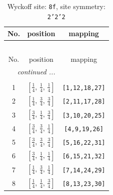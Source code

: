 \documentclass[fleqn,8pt]{jsarticle}
\begin{document}
\begin{longtable}{ccc}
\caption{Wyckoff site: {\tt 8f}, site symmetry: {\tt 2'2'2}}
 \\
 \hline \hline
No. & position & mapping \\ \hline \endfirsthead

\multicolumn{2}{l}{\tablename\ \thetable{}} \\
 \hline \hline
No. & position & mapping \\ \hline \endhead

 \hline \hline
\multicolumn{2}{r}{\footnotesize\it continued ...} \\ \endfoot

 \hline \hline
\multicolumn{2}{r}{} \\ \endlastfoot

1 & $\left[ \frac{1}{4},\, \frac{1}{4},\, \frac{1}{4} \right]$ & {\tt [1,12,18,27]} \\ \hline
2 & $\left[ \frac{1}{4},\, \frac{3}{4},\, \frac{3}{4} \right]$ & {\tt [2,11,17,28]} \\ \hline
3 & $\left[ \frac{3}{4},\, \frac{1}{4},\, \frac{3}{4} \right]$ & {\tt [3,10,20,25]} \\ \hline
4 & $\left[ \frac{3}{4},\, \frac{3}{4},\, \frac{1}{4} \right]$ & {\tt [4,9,19,26]} \\ \hline
5 & $\left[ \frac{3}{4},\, \frac{3}{4},\, \frac{3}{4} \right]$ & {\tt [5,16,22,31]} \\ \hline
6 & $\left[ \frac{3}{4},\, \frac{1}{4},\, \frac{1}{4} \right]$ & {\tt [6,15,21,32]} \\ \hline
7 & $\left[ \frac{1}{4},\, \frac{3}{4},\, \frac{1}{4} \right]$ & {\tt [7,14,24,29]} \\ \hline
8 & $\left[ \frac{1}{4},\, \frac{1}{4},\, \frac{3}{4} \right]$ & {\tt [8,13,23,30]} \\
\end{longtable}
\renewcommand{\arraystretch}{1.2}
\end{document}
